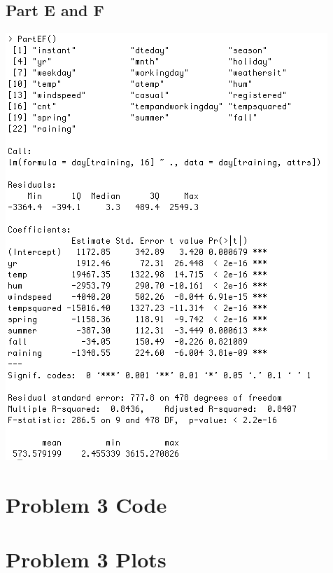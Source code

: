 \documentclass[11pt]{article}
\begin{document}
\subsection{Part E and F}
\label{subsec:problem2efoutput}
\includegraphics[totalheight=0.65\textheight]{Output2PartEF.jpg}
\pagebreak

\section{Problem 3 Code}
\label{sec:problem3code}

\pagebreak

\section{Problem 3 Plots}
\label{sec:problem3plots}
\end{document}
